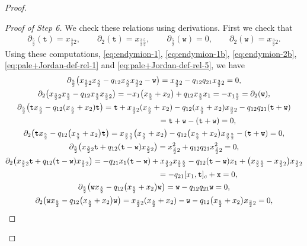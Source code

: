 \documentclass[10pt,a4paper]{amsart}
\numberwithin{equation}{section}
\newcommand{\ttt}{\mathtt{t}}
\newcommand{\wt}{\mathtt{w}}
\newcommand{\xt}{\mathtt{x}}
\newcommand{\tresdos}{\frac{3}{2}}
\newcommand{\cincodos}{\frac{5}{2}}
\begin{document}
\begin{proof}
\begin{proof}[Proof of Step 6]
We check these relations using derivations.
First we check that
\begin{align*}
\partial_{\cincodos}(\ttt)=x_{\tresdos2}, \qquad
\partial_{2}(\ttt)=x_{\tresdos\cincodos},\qquad
\partial_{\cincodos}(\wt)=0, \qquad
\partial_{2}(\wt)=x_{\tresdos2}.
\end{align*}
Using these computations, \eqref{eq:endymion-1}, \eqref{eq:endymion-1b}, \eqref{eq:endymion-2b}, \eqref{eq:pale+Jordan-def-rel-1} and \eqref{eq:pale+Jordan-def-rel-5}, we have
\begin{gather*}
\partial_{\cincodos} \big(x_{\tresdos2}x_{\cincodos}-q_{12}x_{\cincodos}x_{\tresdos2}-\wt\big) =x_{\tresdos2}-q_{12}q_{21}x_{\tresdos2}=0,
\\
\partial_{2} \big(x_{\tresdos2}x_{\cincodos}-q_{12}x_{\cincodos}x_{\tresdos2}\big) = -x_1\big(x_{\cincodos}+x_2\big)+q_{12}x_{\cincodos}x_1=-x_{1\cincodos}=\partial_2(\wt),
\\
\partial_{\cincodos} \big(\ttt x_{\cincodos}-q_{12}(x_{\cincodos}+x_{2})\ttt\big)
=\ttt+x_{\tresdos2} (x_{\cincodos}+x_2)-q_{12}(x_{\cincodos}+x_{2})x_{\tresdos2}-q_{12}q_{21}(\ttt+\wt)
\\ \hphantom{\partial_{\cincodos} \big(\ttt x_{\cincodos}-q_{12}(x_{\cincodos}+x_{2})\ttt\big)}
{} = \ttt+\wt- (\ttt+\wt)=0,
\\
\partial_{2} \big(\ttt x_{\cincodos}-q_{12}\big(x_{\cincodos}+x_{2}\big)\ttt\big) = x_{\tresdos\cincodos} \big(x_{\cincodos}+x_2\big)-q_{12}\big(x_{\cincodos}+x_{2}\big)x_{\tresdos\cincodos}
-(\ttt+\wt)=0,
\\
\partial_{\cincodos} \big(x_{\tresdos2} \ttt+q_{12}(\ttt-\wt)x_{\tresdos2}\big)= x_{\tresdos2}^2+q_{12}q_{21}x_{\tresdos2}^2=0,
\\
\partial_{2} \big(x_{\tresdos2} \ttt+q_{12}(\ttt-\wt)x_{\tresdos2}\big)
= -q_{21}x_1(\ttt-\wt)+x_{\tresdos2}x_{\tresdos\cincodos} -q_{12}(\ttt-\wt)x_1+\big(x_{\tresdos\cincodos}-x_{\tresdos2}\big)x_{\tresdos2}
\\ \hphantom{\partial_{2} \big(x_{\tresdos2} \ttt+q_{12}(\ttt-\wt)x_{\tresdos2}\big)}
{} = -q_{21}[x_1,\ttt]_c+\xt=0,
\\
\partial_{\cincodos} \big(\wt x_{\cincodos} -q_{12}\big(x_{\cincodos}+x_{2}\big)\wt\big)= \wt-q_{12}q_{21}\wt=0,
\\
\partial_{2} \big(\wt x_{\cincodos} -q_{12}\big(x_{\cincodos}+x_{2}\big)\wt\big) = x_{\tresdos2}(x_{\cincodos}+x_2)-\wt-q_{12}\big(x_{\cincodos}+x_2\big)x_{\tresdos2}=0,
\\

\end{gather*}
\end{proof}
\end{proof}
\end{document}
